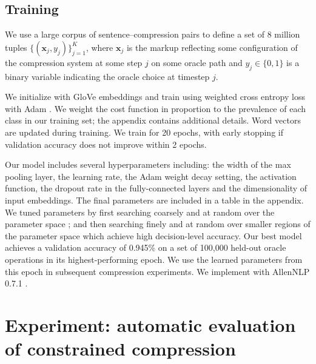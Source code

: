 \documentclass[11pt,a4paper]{article}
\begin{document}
\subsection{Training}

We use a large corpus of sentence--compression pairs \cite{filippova2013overcoming} to define a set of 8 million tuples $\{(\bm{x}_j, y_j) \}_{j=1}^{K}$, where $\bm{x}_j$ is the markup reflecting some configuration of the compression system at some step $j$ on some oracle path and $y_j \in \{0,1\}$ is a binary variable indicating the oracle choice at timestep $j$.

We initialize with GloVe embeddings \cite{pennington2014glove} and train using weighted cross entropy loss with Adam \cite{Kingma2014AdamAM}. We weight the cost function in proportion to the prevalence of each class in our training set; the appendix contains additional details. Word vectors are updated during training. We train for 20 epochs, with early stopping if validation accuracy does not improve within 2 epochs.

Our model includes several hyperparameters including: the width of the max pooling layer, the learning rate, the Adam weight decay setting, the activation function, the dropout rate in the fully-connected layers and the dimensionality of input embeddings. The final parameters are included in a table in the appendix. We tuned parameters by first searching coarsely and at random over the parameter space \cite{Bergstra2012RandomSF}; and then searching finely and at random over smaller regions of the parameter space which achieve high decision-level accuracy. Our best model achieves a validation accuracy of 0.945\% on a set of 100,000 held-out oracle operations in its highest-performing epoch. We use the learned parameters from this epoch in subsequent compression experiments. We implement with AllenNLP 0.7.1 \cite{Gardner2017AllenNLP}.

\section{Experiment: automatic evaluation of constrained compression}\label{s:autoeval}
\end{document}

